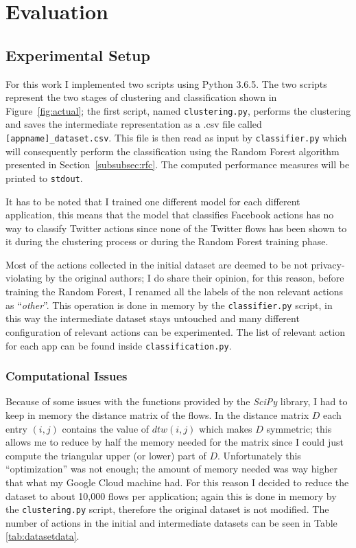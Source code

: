 \section{Evaluation}
\label{sec:eval}
\subsection{Experimental Setup}
\label{subsec:expsetup}
For this work I implemented two scripts using Python 3.6.5. The two scripts represent the two stages of clustering and classification shown in Figure~\ref{fig:actual}; the first script, named \texttt{clustering.py}, performs the clustering and saves the intermediate representation as a .csv file called \texttt{[appname]\_dataset.csv}. This file is then read as input by \texttt{classifier.py} which will consequently perform the classification using the Random Forest algorithm presented in Section~\ref{subsubsec:rfc}. The computed performance measures will be printed to \texttt{stdout}.

It has to be noted that I trained one different model for each different application, this means that the model that classifies Facebook actions has no way to classify Twitter actions since none of the Twitter flows has been shown to it during the clustering process or during the Random Forest training phase.

Most of the actions collected in the initial dataset are deemed to be not privacy-violating by the original authors; I do share their opinion, for this reason, before training the Random Forest, I renamed all the labels of the non relevant actions as ``\textit{other}''. This operation is done in memory by the \texttt{classifier.py} script, in this way the intermediate dataset stays untouched and many different configuration of relevant actions can be experimented. The list of relevant action for each app can be found inside \texttt{classification.py}.


\subsubsection{Computational Issues}
Because of some issues with the functions provided by the \textit{SciPy} library, I had to keep in memory the distance matrix of the flows. In the distance matrix $D$ each entry $(i,j)$ contains the value of $dtw(i, j)$ which makes $D$ symmetric; this allows me to reduce by half the memory needed for the matrix since I could just compute the triangular upper (or lower) part of $D$. Unfortunately this ``optimization'' was not enough; the amount of memory needed was way higher that what my Google Cloud machine had. For this reason I decided to reduce the dataset to about 10,000 flows per application; again this is done in memory by the \texttt{clustering.py} script, therefore the original dataset is not modified. The number of actions in the initial and intermediate datasets can be seen in Table \ref{tab:datasetdata}.

